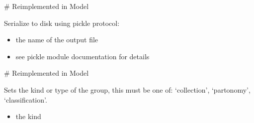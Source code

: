 \documentclass[letterpaper,10pt,english]{sphinxmanual}
\begin{document}
\begin{fulllineitems}
\begin{fulllineitems}
\begin{itemize}
\begin{description}
\end{description}

\end{itemize}

\sphinxAtStartPar
\# Reimplemented in Model

\end{fulllineitems}


\begin{fulllineitems}
\label{\detokenize{modules_doc:cbmpy.CBModel.Group.serializeToDisk}}
\pysigstartsignatures
{}
\pysigstopsignatures
\sphinxAtStartPar
Serialize to disk using pickle protocol:
\begin{itemize}
\item {} 
\sphinxAtStartPar
{} the name of the output file

\item {} \begin{description}
\sphinxAtStartPar
see pickle module documentation for details

\end{description}

\end{itemize}

\sphinxAtStartPar
\# Reimplemented in Model

\end{fulllineitems}


\begin{fulllineitems}
\label{\detokenize{modules_doc:cbmpy.CBModel.Group.setKind}}
\pysigstartsignatures
{}
\pysigstopsignatures
\sphinxAtStartPar
Sets the kind or type of the group, this must be one of: ‘collection’, ‘partonomy’, ‘classification’.
\begin{itemize}
\item {} 
\sphinxAtStartPar
{} the kind


\end{itemize}
\end{fulllineitems}
\end{fulllineitems}
\end{document}
